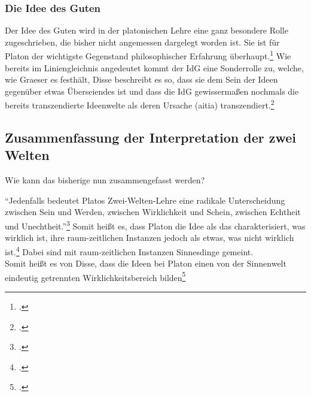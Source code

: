 \subsubsection{Die Idee des Guten}
Der Idee des Guten wird in der platonischen Lehre eine ganz besondere Rolle zugeschrieben, die bisher nicht angemessen dargelegt worden ist. Sie ist  für Platon der wichtigste Gegenstand philosophischer Erfahrung überhaupt.\footcite[vgl.][S. 158]{GraeserPhiloGeschichte}
Wie bereits im Liniengleichnis angedeutet kommt der IdG eine Sonderrolle zu, welche, wie Graeser es festhält, 
Disse beschreibt es so, dass sie dem Sein der Ideen gegenüber etwas Überseiendes ist und dass die IdG gewissermaßen nochmals die bereits transzendierte Ideenwelte als deren Ursache (aitia) transzendiert.\footcite[vgl.][S. 50]{DisseMetaphysik}

\subsection{Zusammenfassung der Interpretation der zwei Welten}
Wie kann das bisherige nun zusammengefasst werden?

\enquote{Jedenfalls bedeutet Platos Zwei-Welten-Lehre eine radikale Unterscheidung zwischen Sein und Werden, zwischen Wirklichkeit und Schein, zwischen Echtheit und Unechtheit.}\footcite[][S. 134]{GraeserPhiloGeschichte}
Somit heißt es, dass Platon die Idee als das charakterisiert, was wirklich ist, ihre raum-zeitlichen Instanzen jedoch als etwas, was nicht wirklich ist.\footcite[vgl.][S. 139]{GraeserPhiloGeschichte} Dabei sind mit raum-zeitlichen Instanzen Sinnesdinge gemeint.\\
Somit heißt es von Disse, dass die Ideen bei Platon einen von der Sinnenwelt eindeutig getrennten Wirklichkeitsbereich bilden\footcite[][S. 31]{DisseMetaphysik}

